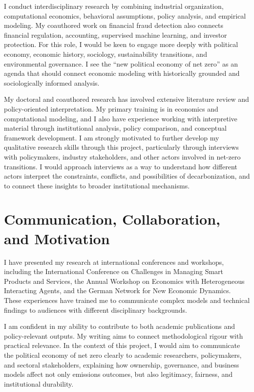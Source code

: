 \documentclass{nfr}
\begin{document}
I conduct interdisciplinary research by combining industrial organization, computational economics, behavioral assumptions, policy analysis, and empirical modeling. My coauthored work on financial fraud detection also connects financial regulation, accounting, supervised machine learning, and investor protection. For this role, I would be keen to engage more deeply with political economy, economic history, sociology, sustainability transitions, and environmental governance. I see the ``new political economy of net zero'' as an agenda that should connect economic modeling with historically grounded and sociologically informed analysis.

My doctoral and coauthored research has involved extensive literature review and policy-oriented interpretation. My primary training is in economics and computational modeling, and I also have experience working with interpretive material through institutional analysis, policy comparison, and conceptual framework development. I am strongly motivated to further develop my qualitative research skills through this project, particularly through interviews with policymakers, industry stakeholders, and other actors involved in net-zero transitions. I would approach interviews as a way to understand how different actors interpret the constraints, conflicts, and possibilities of decarbonization, and to connect these insights to broader institutional mechanisms.

\section*{Communication, Collaboration, and Motivation}

I have presented my research at international conferences and workshops, including the International Conference on Challenges in Managing Smart Products and Services, the Annual Workshop on Economics with Heterogeneous Interacting Agents, and the German Network for New Economic Dynamics. These experiences have trained me to communicate complex models and technical findings to audiences with different disciplinary backgrounds.

I am confident in my ability to contribute to both academic publications and policy-relevant outputs. My writing aims to connect methodological rigour with practical relevance. In the context of this project, I would aim to communicate the political economy of net zero clearly to academic researchers, policymakers, and sectoral stakeholders, explaining how ownership, governance, and business models affect not only emissions outcomes, but also legitimacy, fairness, and institutional durability.
\end{document}
